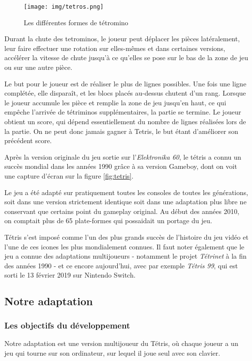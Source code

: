 \documentclass[a4paper, 12pt]{article}
\begin{document}
		\begin{figure}[tb]
			\centering
			\texttt{[image: img/tetros.png]}
			\caption{Les différentes formes de tétromino}
			\label{fig:tetros}
		\end{figure}

		Durant la chute des tetrominos, le joueur peut déplacer les pièces latéralement, leur faire effectuer une rotation sur elles-mêmes et dans certaines versions, accélérer la vitesse de chute jusqu'à ce qu'elles se pose sur le bas de la zone de jeu ou sur une autre pièce. 
		
		Le but pour le joueur est de réaliser le plus de lignes possibles. Une fois une ligne complétée, elle disparaît, et les blocs placés au-dessus chutent d'un rang. 
		Lorsque le joueur accumule les pièce et remplie la zone de jeu jusqu’en haut, ce qui empêche l'arrivée de tétriminos supplémentaires, la partie se termine. Le joueur obtient un score, qui dépend essentiellement du nombre de lignes réalisées lors de la partie. On ne peut donc jamais gagner à Tetris, le but étant d’améliorer son précédent score.

		Après la version originale du jeu sortie sur l'\textit{Elektronika 60}, le tétris a connu un succès mondial dans les années 1990 grâce à sa version Gameboy, dont on voit une capture d'écran sur la figure \ref{fig:tetris}.




		Le jeu a été adapté sur pratiquement toutes les consoles de toutes les générations, soit dans une version strictement identique soit dans une adaptation plus libre ne conservant que certains point du gameplay original. Au début des années 2010, on comptait plus de 65 plate-formes qui possaidait un portage du jeu.

		Tétris s'est imposé comme l'un des plus grands succès de l'histoire du jeu vidéo et l'une de ces icones les plus mondialement connues. Il faut noter également que le jeu a connue des adaptations multijoueurs - notamment le projet \emph{Tétrinet} à la fin des années 1990 - et ce encore aujourd'hui, avec par exemple \emph{Tétris 99}, qui est sorti le 13 février 2019 sur Nintendo Switch.

	\subsection{Notre adaptation}
		\subsubsection{Les objectifs du développement}
			Notre adaptation est une version multijoueur du Tétris, où chaque joueur a un jeu qui tourne sur son ordinateur, sur lequel il joue seul avec son clavier. 
			
\end{document}
